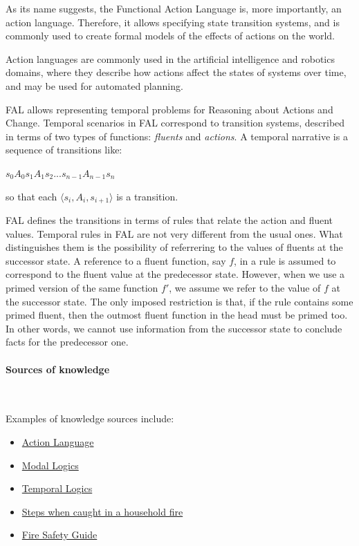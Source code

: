 \documentclass[a4paper,12pt]{report}
\begin{document}
As its name suggests, the {\color{RedViolet} F}unctional {\color{RedViolet}A}ction {\color{RedViolet}L}anguage is, more importantly, an {\color{RedViolet}action language}.
Therefore, it allows specifying {\color{ForestGreen}state transition systems}, and is commonly used to create formal models of the effects of actions on the world.

 Action languages are commonly used in the artificial intelligence and robotics domains, where they describe how actions affect the states of systems over time, and may be used for {\color{ForestGreen}automated planning}.

FAL allows representing temporal problems for Reasoning about Actions and Change. 
Temporal scenarios in FAL correspond to {\color{RedViolet}transition systems}, described in terms of two types of functions: {\it fluents} and {\it actions}. 
A temporal narrative is a sequence of transitions like:

$s_0	A_0	s_1	A_1	s_2	...	s_{n-1}	A_{n-1}	s_n$

so that each $ \langle s_i,A_i,s_{i+1}  \rangle$ is a transition.

FAL defines the transitions in terms of rules that relate the action and fluent values.
Temporal rules in FAL are not very different from the usual ones.
What distinguishes them is the possibility of referrering to the values of fluents at the successor state. 
A reference to a fluent function, say $f$, in a rule is assumed to correspond to the fluent value at the predecessor state.
However, when we use a primed version of the same function $f'$, we assume we refer to the value of $f$ at the successor state.
The only imposed restriction is that, if the rule contains some primed fluent, then the outmost fluent function in the head must be primed too. 
In other words, we cannot use information from the successor state to conclude facts for the predecessor one.

\paragraph{Sources of knowledge} $ $

Examples of knowledge sources include:
\begin{itemize}

\item  \href{https://en.wikipedia.org/wiki/Action_language}{Action Language}
\item \href{https://en.wikipedia.org/wiki/Modal_logic#Temporal_logic}{Modal Logics}
\item \href{https://en.wikipedia.org/wiki/Temporal_logic}{Temporal Logics}
\item \href{https://www.quora.com/What-should-one-do-when-caught-in-a-house-fire}{Steps when caught in a household fire}
\item \href{http://emergency.tufts.edu/guide/fire-safety/}{Fire Safety Guide}

\end{itemize}
\end{document}
